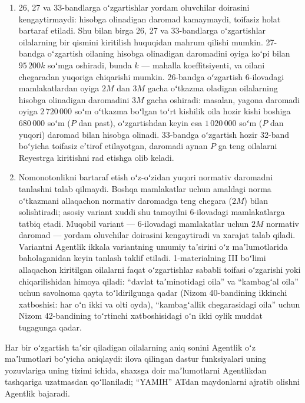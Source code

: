\documentclass[14pt,a4paper]{extarticle}
\begin{document}
\begin{enumerate}[leftmargin=1.27cm]
\item 26, 27 va 33-bandlarga oʻzgartishlar yordam oluvchilar doirasini kengaytirmaydi: hisobga olinadigan daromad kamaymaydi, toifasiz holat bartaraf etiladi. Shu bilan birga 26, 27 va 33-bandlarga oʻzgartishlar oilalarning bir qismini kiritilish huquqidan mahrum qilishi mumkin. 27-bandga oʻzgartish oilaning hisobga olinadigan daromadini oyiga koʻpi bilan $95\,200k$ soʻmga oshiradi, bunda $k$ — mahalla koeffitsiyenti, va oilani chegaradan yuqoriga chiqarishi mumkin. 26-bandga oʻzgartish 6-ilovadagi mamlakatlardan oyiga $2M$ dan $3M$ gacha oʻtkazma oladigan oilalarning hisobga olinadigan daromadini $3M$ gacha oshiradi: masalan, yagona daromadi oyiga $2\,720\,000$ soʻm oʻtkazma boʻlgan toʻrt kishilik oila hozir kishi boshiga $680\,000$ soʻm ($P$ dan past), oʻzgartishdan keyin esa $1\,020\,000$ soʻm ($P$ dan yuqori) daromad bilan hisobga olinadi. 33-bandga oʻzgartish hozir 32-band boʻyicha toifasiz eʼtirof etilayotgan, daromadi aynan $P$ ga teng oilalarni Reyestrga kiritishni rad etishga olib keladi.
\item Nomonotonlikni bartaraf etish oʻz-oʻzidan yuqori normativ daromadni tanlashni talab qilmaydi. Boshqa mamlakatlar uchun amaldagi norma oʻtkazmani allaqachon normativ daromadga teng chegara ($2M$) bilan solishtiradi; asosiy variant xuddi shu tamoyilni 6-ilovadagi mamlakatlarga tatbiq etadi. Muqobil variant — 6-ilovadagi mamlakatlar uchun $2M$ normativ daromad — yordam oluvchilar doirasini kengaytiradi va xarajat talab qiladi. Variantni Agentlik ikkala variantning umumiy taʼsirini oʻz maʼlumotlarida baholaganidan keyin tanlash taklif etiladi. 1-materialning III boʻlimi allaqachon kiritilgan oilalarni faqat oʻzgartishlar sababli toifasi oʻzgarishi yoki chiqarilishidan himoya qiladi: “davlat taʼminotidagi oila” va “kambagʻal oila” uchun savolnoma qayta toʻldirilgunga qadar (Nizom 40-bandining ikkinchi xatboshisi: har oʻn ikki va olti oyda), “kambagʻallik chegarasidagi oila” uchun Nizom 42-bandining toʻrtinchi xatboshisidagi oʻn ikki oylik muddat tugagunga qadar.
\end{enumerate}
Har bir oʻzgartish taʼsir qiladigan oilalarning aniq sonini Agentlik oʻz maʼlumotlari boʻyicha aniqlaydi: ilova qilingan dastur funksiyalari uning yozuvlariga uning tizimi ichida, shaxsga doir maʼlumotlarni Agentlikdan tashqariga uzatmasdan qoʻllaniladi; “YAMIH” ATdan maydonlarni ajratib olishni Agentlik bajaradi.
\end{document}
